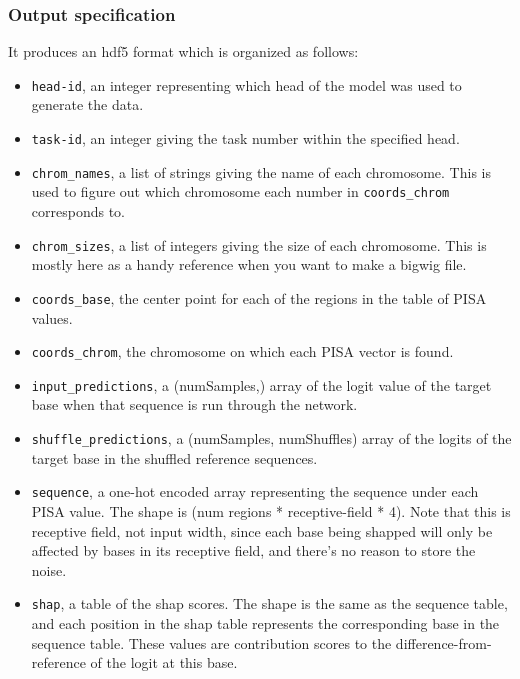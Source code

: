\documentclass{article}
\begin{document}
\subsubsection{Output specification}

It produces an hdf5 format which is organized as follows:

\begin{itemize}
        \item \texttt{head-id}, an integer representing which head of the model was used to generate the data.
        \item \texttt{task-id}, an integer giving the task number within the specified head.
        \item \texttt{chrom\_names}, a list of strings giving the name of each chromosome. This is used to figure out which chromosome each number in \texttt{coords\_chrom} corresponds to.
        \item \texttt{chrom\_sizes}, a list of integers giving the size of each chromosome. This is mostly here as a handy reference when you want to make a bigwig file.
        \item \texttt{coords\_base}, the center point for each of the regions in the table of PISA values.
        \item \texttt{coords\_chrom}, the chromosome on which each PISA vector is found.
        \item \texttt{input\_predictions}, a (numSamples,) array of the logit value of the target base when that sequence is run through the network.
        \item \texttt{shuffle\_predictions}, a (numSamples, numShuffles) array of the logits of the target base in the shuffled reference sequences.
        \item \texttt{sequence}, a one-hot encoded array representing the sequence under each PISA value. 
                The shape is (num regions * receptive-field * 4). Note that this is receptive field, not input width, since each base being shapped will only be affected by bases in its receptive field, and there's no reason to store the noise.
        \item \texttt{shap}, a table of the shap scores. 
                The shape is the same as the sequence table, and each position in the shap table represents the corresponding base in the sequence table. 
                These values are contribution scores to the difference-from-reference of the logit at this base.

\end{itemize}
\end{document}
